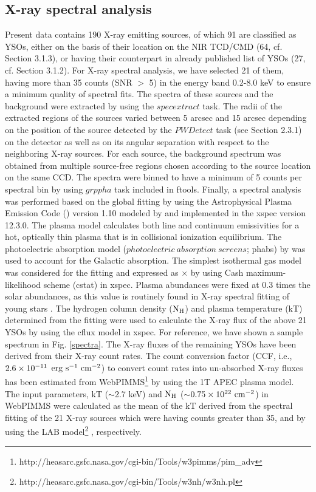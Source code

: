 \documentclass[a4paper,fleqn,usenatbib,useAMS]{mnras}
\begin{document}
\subsection{X-ray spectral analysis}

Present data contains 190 X-ray emitting sources, of which 91 are classified as YSOs, 
either on the basis of their location on the NIR TCD/CMD (64, cf. Section 3.1.3),
or having their counterpart in already published list of YSOs (27, cf. Section 3.1.2).
For X-ray spectral analysis, we have selected 21 of them, having more than 35  counts
(SNR $>$ 5) in the energy band 0.2-8.0 keV
to ensure a minimum quality of spectral fits.
The spectra of these sources and the background were extracted by
using the  $specextract$ task. The radii of the extracted regions of the sources
varied between 5 arcsec and 15 arcsec depending on the position
of the source detected by the $PWDetect$ task (see Section 2.3.1) on the 
detector as well as on its angular separation 
with respect to the neighboring X-ray sources.
For each source, the background spectrum was obtained from multiple source-free regions
chosen according to the source location on the same CCD.
The spectra were binned to have a minimum of 5 counts per spectral bin by using $grppha$ task 
included in {\sc ftools}.
Finally, a spectral analysis was performed based on the global fitting by using
the Astrophysical Plasma Emission Code ({}) version 1.10 modeled by \citet{smi+01} and
implemented in the {\sc xspec} version 12.3.0. The plasma model
{} calculates both line and continuum emissivities for a hot,
optically thin plasma that is in collisional ionization equilibrium.
The photoelectric absorption model ($photoelectric~absorption~screens$; {\sc phabs}) by  
\citet{bal+92} was used to account for the Galactic absorption. 
The simplest isothermal gas model was considered for the fitting and expressed as {} $\times$ {} by using
Cash maximum-likelihood scheme (cstat) in {\sc xspec}. 
Plasma abundances were fixed at 0.3 times the solar abundances, as this value is routinely found in X-ray spectral fitting of young stars  \citep[e.g.,][]{fei+02, cur+09, bha+13}.
The hydrogen column density ($\rm{N_H}$) and plasma temperature (kT) determined from the fitting were used to
calculate the X-ray flux of the above 21 YSOs by using the cflux model in xspec.
For reference, we have shown a sample spectrum in Fig. \ref{spectra}.
The X-ray fluxes of the remaining YSOs have been  derived from their X-ray count rates.
The count conversion factor (CCF, i.e.,  $\rm{2.6\times10^{-11}}$ ${\rm erg~s^{-1}~cm^{-2}}$) to convert count rates into un-absorbed X-ray fluxes has been estimated 
from WebPIMMS\footnote{http://heasarc.gsfc.nasa.gov/cgi-bin/Tools/w3pimms/pim\_adv} 
by using the {\sc 1T APEC} plasma model. The input parameters, kT ($\sim$2.7 keV) and $\rm{N_H}$ ($\sim$$\rm{0.75\times10^{22}~cm^{-2}}$) in WebPIMMS 
were calculated as the mean of the kT  derived from the spectral fitting of the 21 X-ray sources which were
having counts greater than 35, and by using the LAB model\footnote{http://heasarc.gsfc.nasa.gov/cgi-bin/Tools/w3nh/w3nh.pl} \citep{kal+05}, respectively.
\end{document}
